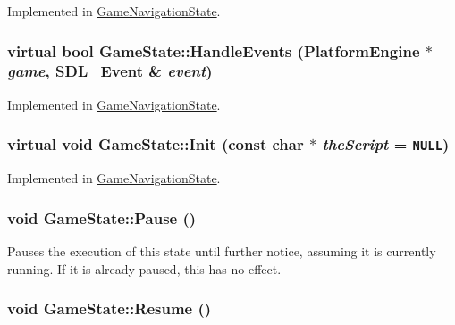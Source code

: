 Implemented in \hyperlink{class_game_navigation_state_e6b88e854b682be866b2aac2005278a5}{GameNavigationState}.\hypertarget{class_game_state_de7bd9bda91253614322ca0ea77b7a14}{
\subsubsection[{HandleEvents}]{\setlength{\rightskip}{0pt plus 5cm}virtual bool GameState::HandleEvents ({\bf PlatformEngine} $\ast$ {\em game}, \/  SDL\_\-Event \& {\em event})}}
\label{dd/d87/class_game_state_de7bd9bda91253614322ca0ea77b7a14}




Implemented in \hyperlink{class_game_navigation_state_6e7c13d35a33478673c62ae55394cfdc}{GameNavigationState}.\hypertarget{class_game_state_488fd39ceb2907b13e11f03607f16e5f}{
\subsubsection[{Init}]{\setlength{\rightskip}{0pt plus 5cm}virtual void GameState::Init (const char $\ast$ {\em theScript} = {\tt NULL})}}
\label{dd/d87/class_game_state_488fd39ceb2907b13e11f03607f16e5f}




Implemented in \hyperlink{class_game_navigation_state_63c99936c2338e5cfeb71c8ffbd88b7f}{GameNavigationState}.\hypertarget{class_game_state_0c47c6969a4e0bb32d6cdf7bf9376817}{
\subsubsection[{Pause}]{\setlength{\rightskip}{0pt plus 5cm}void GameState::Pause ()}}
\label{dd/d87/class_game_state_0c47c6969a4e0bb32d6cdf7bf9376817}


Pauses the execution of this state until further notice, assuming it is currently running. If it is already paused, this has no effect. \hypertarget{class_game_state_d12ece3c3fb066281b73b07a315f04e8}{
\subsubsection[{Resume}]{\setlength{\rightskip}{0pt plus 5cm}void GameState::Resume ()}}
\label{dd/d87/class_game_state_d12ece3c3fb066281b73b07a315f04e8}


